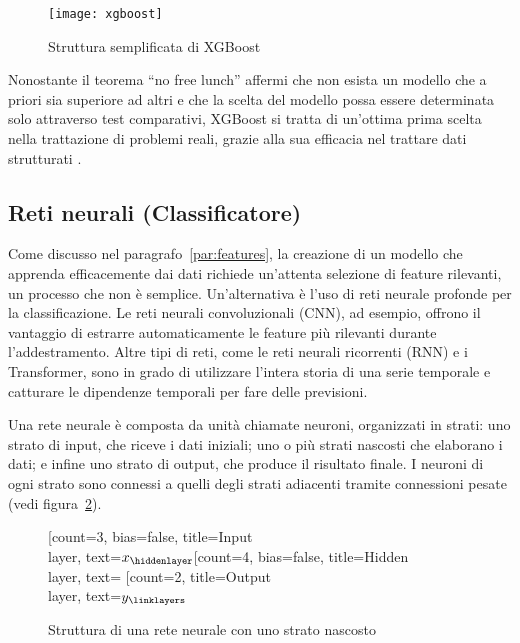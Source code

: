 \begin{figure}[!ht]
    \centering
    \texttt{[image: xgboost]}
    \caption{Struttura semplificata di XGBoost \protect\cite{guo2020}}
    \label{fig:xgboost}
\end{figure}

Nonostante il teorema ``no free lunch'' affermi che non esista un modello che
a priori sia superiore ad altri e che la scelta del modello possa essere
determinata solo attraverso test comparativi, XGBoost si tratta di un'ottima
prima scelta nella trattazione di problemi reali, grazie alla sua efficacia
nel trattare dati strutturati \cite{shwartz2021, chen2016}.

\subsection{Reti neurali (Classificatore)}
\label{sec:nn}

Come discusso nel paragrafo~\ref{par:features}, la creazione di un modello che
apprenda efficacemente dai dati richiede un'attenta selezione di feature
rilevanti, un processo che non è semplice. Un'alternativa è l'uso di reti
neurale profonde per la classificazione. Le reti neurali convoluzionali (CNN),
ad esempio, offrono il vantaggio di estrarre automaticamente le feature più
rilevanti durante l'addestramento. Altre tipi di reti, come le reti neurali
ricorrenti (RNN) e i Transformer, sono in grado di utilizzare l'intera storia
di una serie temporale e catturare le dipendenze temporali per fare delle
previsioni.

Una rete neurale è composta da unità chiamate neuroni, organizzati in strati:
uno strato di input, che riceve i dati iniziali; uno o più strati nascosti che
elaborano i dati; e infine uno strato di output, che produce il risultato
finale. I neuroni di ogni strato sono connessi a quelli degli strati adiacenti
tramite connessioni pesate (vedi figura~\ref{fig:neural_network}).

\begin{figure}[!ht]
    \centering
    \begin{neuralnetwork}[height=4]
        \newcommand{\nodetextclear}[2]{}
        \newcommand{\nodetextx}[2]{$x_#2$}
        \newcommand{\nodetexty}[2]{$y_#2$}
        [count=3, bias=false, title=Input\\layer, text=\nodetextx]
        \hiddenlayer[count=4, bias=false, title=Hidden\\layer, text=\nodetextclear] \linklayers
        \outputlayer[count=2, title=Output\\layer, text=\nodetexty] \linklayers
    \end{neuralnetwork}
    \caption{Struttura di una rete neurale con uno strato nascosto} 
    \label{fig:neural_network}
\end{figure}

